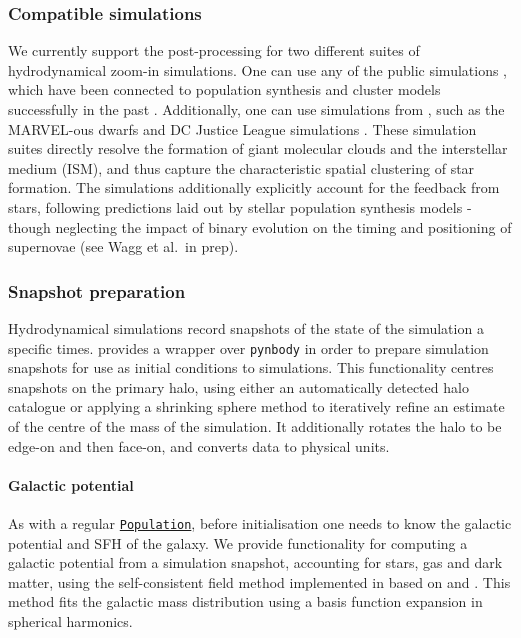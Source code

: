 \documentclass[twocolumn, twocolappendix, oneside]{aastex631}
\newcommand{\codeLink}[2]{{\href{https://cogsworth.readthedocs.io/en/latest/api/cogsworth.#2.#1.html}{\color{codecolour} \texttt{#1}}}}
\begin{document}
\subsubsection{Compatible simulations}

We currently support the post-processing for two different suites of hydrodynamical zoom-in simulations. One can use any of the public \fire simulations \citep{Wetzel+2016, Hopkins+2018:2018MNRAS.480..800H, Sanderson+2020}, which have been connected to population synthesis and cluster models successfully in the past \citep[e.g.,][]{Lamberts+2018:2018MNRAS.480.2704L, Chawla+2022:2022ApJ...931..107C, balls_of_FIRE_1, balls_of_FIRE_2, Thiele+2023:2023ApJ...945..162T}. Additionally, one can use simulations from \changa, such as the MARVEL-ous dwarfs and DC Justice League simulations \citep{Applebaum+2021:2021ApJ...906...96A, Christensen+2023:2023AAS...24140704C}. These simulation suites directly resolve the formation of giant molecular clouds and the interstellar medium (ISM), and thus capture the characteristic spatial clustering of star formation. The simulations additionally explicitly account for the feedback from stars, following predictions laid out by stellar population synthesis models - though neglecting the impact of binary evolution on the timing and positioning of supernovae (see Wagg et al.\ in prep).

\subsubsection{Snapshot preparation}\label{sec:prep_snapshots}

Hydrodynamical simulations record snapshots of the state of the simulation a specific times. \cogsworth provides a wrapper over \texttt{pynbody} \citep{pynbody} in order to prepare simulation snapshots for use as initial conditions to simulations. This functionality centres snapshots on the primary halo, using either an automatically detected halo catalogue or applying a shrinking sphere method to iteratively refine an estimate of the centre of the mass of the simulation. It additionally rotates the halo to be edge-on and then face-on, and converts data to physical units. 

\paragraph{Galactic potential} As with a regular \codeLink{Population}{pop}, before initialisation one needs to know the galactic potential and SFH of the galaxy. We provide functionality for computing a galactic potential from a simulation snapshot, accounting for stars, gas and dark matter, using the self-consistent field method implemented in \gala based on \citet{Hernquist+1992:1992ApJ...386..375H} and \citet{Lowing+2011:2011MNRAS.416.2697L}. This method fits the galactic mass distribution using a basis function expansion in spherical harmonics.
\end{document}
